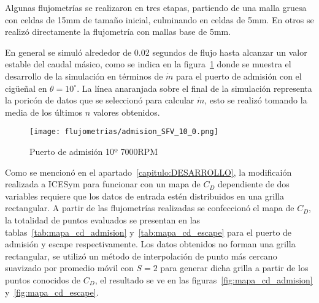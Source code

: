 
Algunas flujometrías se realizaron en tres etapas, partiendo de una malla gruesa
con celdas de 15mm de tamaño inicial, culminando en celdas de 5mm.
%
En otros se realizó directamente la flujometría con mallas base de 5mm.

En general se simuló alrededor de 0.02 segundos de flujo  hasta alcanzar un
valor estable del caudal másico, como se indica en la
figura~\ref{fig:adm_10_7000rpm} donde se muestra el desarrollo de la simulación
en términos de $\dot{m}$ para el puerto de admisión con el cigüeñal en
$\theta=10^{\circ}$.
%
La línea anaranjada sobre el final de la simulación representa la poricón de
datos que se seleccionó para calcular $\dot{m}$, esto se realizó tomando la
media de los últimos $n$ valores obtenidos.

\begin{figure}[ht]
  \centering
  \texttt{[image: flujometrias/admision\_SFV\_10\_0.png]}
  \caption{Puerto de admisión 10º \@ 7000RPM}\label{fig:adm_10_7000rpm}
\end{figure}

Como se mencionó en el apartado~\ref{capitulo:DESARROLLO}, la modificaión
realizada a ICESym para funcionar con un mapa de $C_{D}$ dependiente de dos
variables requiere que los datos de entrada estén distribuidos en una grilla
rectangular.
%
A partir de las flujometrías realizadas se confeccionó el mapa de $C_{D}$, la
totalidad de puntos evaluados se presentan en las
tablas~\ref{tab:mapa_cd_admision} y~\ref{tab:mapa_cd_escape} para el puerto de
admisión y escape respectivamente.
%
Los datos obtenidos no forman una grilla rectangular, se utilizó un método de
interpolación de punto más cercano suavizado por promedio móvil con $S=2$ para
generar dicha grilla a partir de los puntos conocidos de $C_{D}$, el resultado
se ve en las figuras~\ref{fig:mapa_cd_admision} y~\ref{fig:mapa_cd_escape}.

